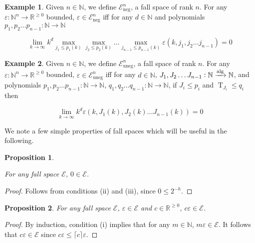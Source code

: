 \documentclass{article}
\numberwithin{equation}{section}
\theoremstyle{definition}
\newtheorem{example}{Example}[section]
\theoremstyle{plain}
\newtheorem{proposition}{Proposition}[section]
\DeclareMathOperator{\T}{T}
\newcommand{\Nats}{\mathbb{N}}
\newcommand{\Reals}{\mathbb{R}}
\newcommand{\Lim}[1]{\lim_{#1 \rightarrow \infty}}
\newcommand{\Ceil}[1]{\lceil #1 \rceil}
\newcommand{\Fall}{\mathcal{E}}
\newcommand{\Alg}{\xrightarrow{\textnormal{alg}}}
\begin{document}
\begin{example}

Given $n \in \Nats$, we define $\Fall_{\text{neg}}^n$, a fall space of rank $n$. For any $\varepsilon: \Nats^n \rightarrow \Reals^{\geq 0}$ bounded, $\varepsilon \in \Fall_{\text{neg}}^n$ iff for any $d \in \Nats$ and polynomials ${p_1,p_2 \ldots p_{n-1}: \Nats \rightarrow \Nats}$

$$\Lim{k} k^d \max_{j_1 \leq p_1(k)} \max_{j_2 \leq p_2(k)} \ldots \max_{j_{n-1} \leq p_{n-1}(k)} \varepsilon(k,j_1,j_2 \ldots j_{n-1}) = 0$$

\end{example}

\begin{example}

Given $n \in \Nats$, we define $\Fall_{\text{uneg}}^n$, a fall space of rank $n$. For any ${\varepsilon: \Nats^n \rightarrow \Reals^{\geq 0}}$ bounded, $\varepsilon \in \Fall_{\text{uneg}}^n$ iff for any $d \in \Nats$, ${J_1,J_2 \ldots J_{n-1}: \Nats \Alg \Nats}$, and polynomials ${p_1,p_2 \ldots p_{n-1}: \Nats \rightarrow \Nats}$, ${q_1,q_2 \ldots q_{n-1}: \Nats \rightarrow \Nats}$, if $J_i \leq p_i$ and $\T_{J_i} \leq q_i$ then

$$\Lim{k} k^d \varepsilon(k,J_1(k),J_2(k) \ldots J_{n-1}(k)) = 0$$

\end{example}

We note a few simple properties of fall spaces which will be useful in the following.

\begin{proposition}
\label{prp:err_spc_zero}

For any fall space $\Fall$, $0 \in \Fall$.

\end{proposition}

\begin{proof}

Follows from conditions (ii) and (iii), since $0 \leq 2^{-h}$.

\end{proof}

\begin{proposition}

For any fall space $\Fall$, $\varepsilon \in \Fall$ and $c \in \Reals^{\geq 0}$, $c \varepsilon \in \Fall$.

\end{proposition}

\begin{proof}

By induction, condition (i) implies that for any $m \in \Nats$, $m\varepsilon \in \Fall$. It follows that $c\varepsilon \in \Fall$ since $c\varepsilon \leq \Ceil{c}\varepsilon$.

\end{proof}
\end{document}
